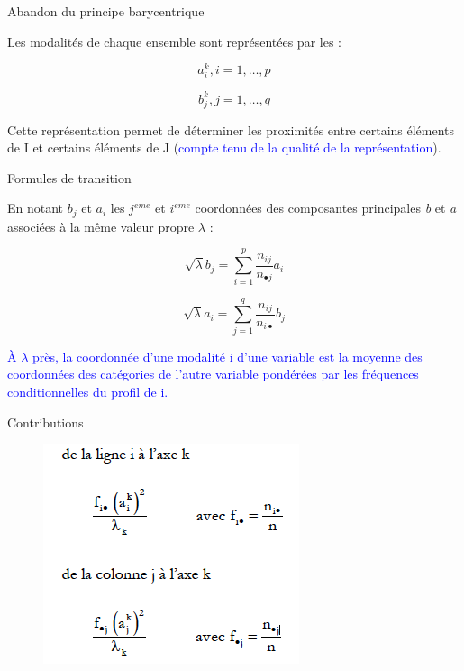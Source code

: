 \documentclass[10pt]{beamer}
\begin{document}




\begin{frame}{Abandon du principe barycentrique}

Les modalités de chaque ensemble sont représentées par les :

$$a^k_i,  i=1, \ldots, p$$

$$b^k_j ,  j=1, \ldots, q $$

Cette représentation permet de déterminer les proximités entre
certains éléments de I et certains éléments de J (\textcolor{blue}{compte tenu de la
qualité de la représentation}).

\end{frame}



\begin{frame}{Formules de transition}

En notant $b_j$ et $a_i$ les $j^{eme}$ et $i^{eme}$ coordonnées des composantes principales \textit{b} et \textit{a} associées à la même valeur propre $\lambda$ : 

$$ \sqrt{\lambda}b_j=\sum_{i=1}^p\frac{n_{ij}}{n_{\bullet j}}  a_i$$

$$ \sqrt{\lambda}a_i=\sum_{j=1}^q\frac{n_{ij}}{n_{i \bullet }}  b_j$$

\textcolor{blue}{À $\lambda$ près, la coordonnée d’une modalité i d’une variable est la moyenne des coordonnées des catégories de l’autre variable pondérées par les fréquences conditionnelles du profil de i.}
\end{frame}



\begin{frame}{Contributions}
\begin{figure}
\includegraphics[scale=0.6]{exemple16.png}  
\end{figure}
\end{frame}
\end{document}

